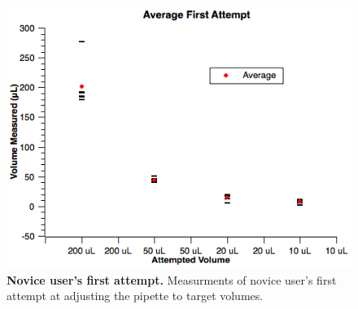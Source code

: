 \documentclass[]{article}
\begin{document}
\begin{figure}
\includegraphics[scale=0.7]{fig3.PNG}
\caption{
{\bf Novice user's first attempt.} Measurments of novice user's first attempt at adjusting the pipette to target volumes.
}
\label{figure3}
\end{figure}




\end{document}
